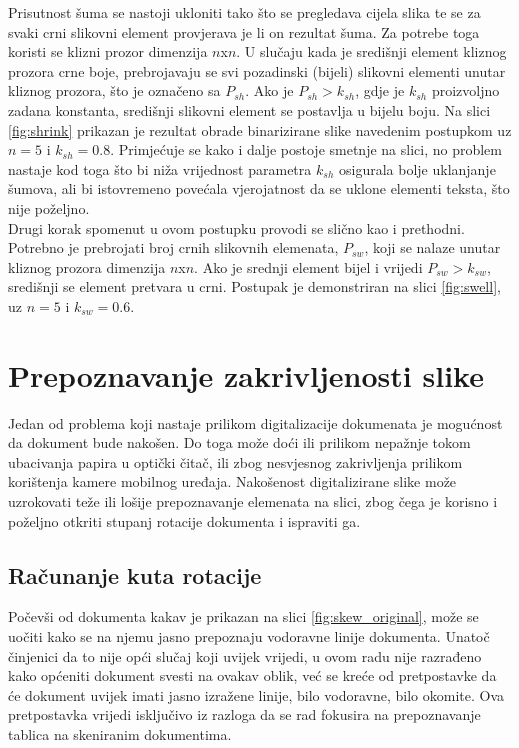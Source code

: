 \documentclass[times, utf8, zavrsni, numeric]{fer}
\begin{document}
Prisutnost šuma se nastoji ukloniti tako što se pregledava cijela slika te se za svaki crni slikovni element provjerava je li on rezultat šuma.
Za potrebe toga koristi se klizni prozor dimenzija $n$x$n$.
U slučaju kada je središnji element kliznog prozora crne boje, prebrojavaju se svi pozadinski (bijeli) slikovni elementi unutar kliznog prozora, što je označeno sa $P_{sh}$.
Ako je $P_{sh} > k_{sh}$, gdje je $k_{sh}$ proizvoljno zadana konstanta, središnji slikovni element se postavlja u bijelu boju.
Na slici \ref{fig:shrink} prikazan je rezultat obrade binarizirane slike navedenim postupkom uz $n = 5$ i $k_{sh} = 0.8$.
Primjećuje se kako i dalje postoje smetnje na slici, no problem nastaje kod toga što bi niža vrijednost parametra $k_{sh}$ osigurala bolje uklanjanje šumova, ali bi istovremeno povećala vjerojatnost da se uklone elementi teksta, što nije poželjno.\\

Drugi korak spomenut u ovom postupku provodi se slično kao i prethodni.
Potrebno je prebrojati broj crnih slikovnih elemenata, $P_{sw}$, koji se nalaze unutar kliznog prozora dimenzija $n$x$n$.
Ako je srednji element bijel i vrijedi $P_{sw} > k_{sw}$, središnji se element pretvara u crni.
Postupak je demonstriran na slici \ref{fig:swell}, uz $n = 5$ i $k_{sw} = 0.6$.


\chapter{Prepoznavanje zakrivljenosti slike}
Jedan od problema koji nastaje prilikom digitalizacije dokumenata je mogućnost da dokument bude nakošen. 
Do toga može doći ili prilikom nepažnje tokom ubacivanja papira u optički čitač, ili zbog nesvjesnog zakrivljenja prilikom korištenja kamere mobilnog uređaja.
Nakošenost digitalizirane slike može uzrokovati teže ili lošije prepoznavanje elemenata na slici, zbog čega je korisno i poželjno otkriti stupanj rotacije dokumenta i ispraviti ga.

\section{Računanje kuta rotacije}
Počevši od dokumenta kakav je prikazan na slici \ref{fig:skew_original}, može se uočiti kako se na njemu jasno prepoznaju vodoravne linije dokumenta.
Unatoč činjenici da to nije opći slučaj koji uvijek vrijedi, u ovom radu nije razrađeno kako općeniti dokument svesti na ovakav oblik, već se kreće od pretpostavke da će dokument uvijek imati jasno izražene linije, bilo vodoravne, bilo okomite.
Ova pretpostavka vrijedi isključivo iz razloga da se rad fokusira na prepoznavanje tablica na skeniranim dokumentima.\\
\end{document}
